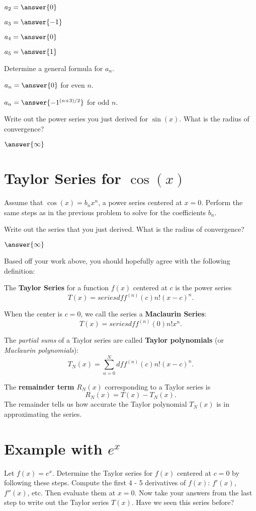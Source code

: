\documentclass{ximera}
\begin{document}
$a_2 = \answer{0}$

$a_3 = \answer{-1}$

$a_4 = \answer{0}$

$a_5 = \answer{1}$

Determine a general formula for $a_n$.

$a_n = \answer{0}$ for even $n$.

$a_n = \answer{-1^{(n+3)/2}}$ for odd $n$.

Write out the power series you just derived for $\sin(x)$. What is the radius of convergence?

$\answer{\infty}$

\section{Taylor Series for $\cos(x)$}

Assume that $\cos(x) = b_n x^n$, a power series centered at $x=0$. Perform the same steps as in the previous problem to solve for the coefficients $b_n$.

Write out the series that you just derived. What is the radius of convergence?

$\answer{\infty}$

Based off your work above, you should hopefully agree with the following definition:

\begin{definition}
The \textbf{Taylor Series} for a function $f(x)$ centered at $c$ is the power series
		\[
			T(x) = series df{f^{(n)}(c)}{n!}(x-c)^n.
		\]
	
	When the center is $c=0$, we call the series a \textbf{Maclaurin Series}:
		\[
			T(x) = series df{f^{(n)}(0)}{n!}x^n.
		\]	
		
\end{definition}
\begin{definition}
The \emph{partial sums} of a Taylor series are called \textbf{Taylor polynomials} (or \emph{Maclaurin polynomials}):
		\[
			T_N(x) = \sum_{n=0}^N df{f^{(n)}(c)}{n!}(x-c)^n.
		\]
	
    \end{definition}
    \begin{definition}
The \textbf{remainder term} $R_N(x)$ corresponding to a Taylor series is
		\[
			R_N(x) = T(x) - T_N(x).
		\]
	The remainder tells us how accurate the Taylor polynomial $T_N(x)$ is in approximating the series.
\end{definition}
\section{Example with $e^x$}
	Let $f(x) = e^x$. Determine the Taylor series for $f(x)$ centered at $c=0$ by following these steps. 
 Compute the first 4 - 5 derivatives of $f(x)$: $f'(x)$, $f''(x)$, etc. Then evaluate them at $x=0$.
Now take your answers from the last step to write out the Taylor series $T(x)$. 
Have we seen this series before?
	
\end{document}
